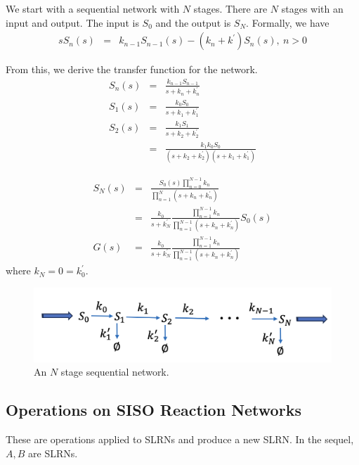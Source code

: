 \documentclass[unnumsec,webpdf,contemporary,large]{oup-authoring-template}%
\theoremstyle{thmstyleone}%
\theoremstyle{thmstyletwo}%
\theoremstyle{thmstylethree}%
\begin{document}
We start with a sequential network with $N$ stages.
There are $N$ stages with an input and output. The input is $S_0$ and the output is $S_N$. Formally, we have
\begin{eqnarray}
s S_n (s) & =&  k_{n-1} S_{n-1} (s) - (k_n + k^{\prime}) S_n (s) ,~ n>0
\end{eqnarray}

From this, we derive the transfer function for the network.
\begin{align}
S_n (s) & = & \frac{k_{n-1} S_{n-1}}{s + k_n + k^{\prime}_n} \nonumber \\
S_1 (s) & = & \frac{k_0 S_0}{s + k_1 + k^{\prime}_1} \nonumber \\
S_2 (s) & = & \frac{k_1 S_1}{s + k_2 + k^{\prime}_2} \nonumber \\
  & = & \frac{k_1 k_0 S_0}{(s + k_2 + k^{\prime}_2)(s + k_1 + k^{\prime}_1)}
\end{align}

\begin{eqnarray}
S_N (s) & = & \frac{S_0 (s) \prod_{n=0}^{N-1} k_n }{\prod_{n=1}^N(s + k_n + k^{\prime}_n)} \nonumber \\
    & = &  \frac{ k_0 }{s  +  k^{\prime}_N}  
    \frac{\prod_{n=1}^{N-1} k_n }{\prod_{n=1}^{N-1}(s + k_n + k^{\prime}_n)} S_0(s) \nonumber \\
G (s) & = &  \frac{ k_0 }{s  +  k^{\prime}_N}  
    \frac{\prod_{n=1}^{N-1} k_n }{\prod_{n=1}^{N-1}(s + k_n + k^{\prime}_n)}
\end{eqnarray}
where $k_N = 0= k^{\prime}_0$.

\begin{figure}
        \centering
         \includegraphics[scale=0.4]{figures/sequential_network.png}
          \caption[]{An $N$ stage sequential network.}
         \label{fig:sequential_network}
\end{figure}


\subsection{Operations on SISO Reaction Networks}
These are operations applied to SLRNs and produce a new SLRN.
In the sequel, $A, B$ are SLRNs.
\end{document}
